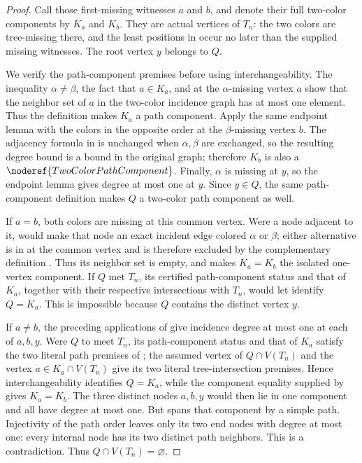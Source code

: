 \begin{proof}
Call those first-missing witnesses \(a\) and \(b\), and denote their full
two-color components by \(K_a\) and \(K_b\).  They are actual vertices of
\(T_n\): the two colors are tree-missing there, and the least positions in
 occur no later than the supplied
missing witnesses.  The root vertex \(y\) belongs to \(Q\).

We verify the path-component premises before using interchangeability.
The inequality \(\alpha\ne\beta\), the fact that \(a\in K_a\), and
 at the \(\alpha\)-missing vertex
\(a\) show that the neighbor set of \(a\) in the two-color incidence graph
has at most one element.  Thus the definition
 makes \(K_a\) a path component.  Apply the
same endpoint lemma with the colors in the opposite order at the
\(\beta\)-missing vertex \(b\).  The adjacency formula in
 is unchanged when \(\alpha,\beta\) are
exchanged, so the resulting degree bound is a bound in the original graph;
therefore \(K_b\) is also a \(\noderef{TwoColorPathComponent}\).  Finally,
\(\alpha\) is missing at \(y\), so the endpoint lemma gives degree at most
one at \(y\).  Since \(y\in Q\), the same path-component definition makes
\(Q\) a two-color path component as well.

If \(a=b\), both colors are missing at this common vertex.  Were a node
adjacent to it,  would make that node an
exact incident edge colored \(\alpha\) or \(\beta\); either alternative is
in  at the common vertex and is therefore excluded
by the complementary definition .  Thus its neighbor
set is empty, and  makes \(K_a=K_b\) the isolated
one-vertex component.  If \(Q\) met \(T_n\), its certified path-component
status and that of \(K_a\), together with their respective intersections
with \(T_n\), would let  identify \(Q=K_a\).
This is impossible because \(Q\) contains the distinct vertex \(y\).

If \(a\ne b\), the preceding applications of
 give incidence degree at most one
at each of \(a,b,y\).  Were \(Q\) to meet \(T_n\), its path-component
status and that of \(K_a\) satisfy the two literal path premises of
; the assumed vertex of \(Q\cap V(T_n)\) and
the vertex \(a\in K_a\cap V(T_n)\) give its two literal tree-intersection
premises.  Hence interchangeability identifies \(Q=K_a\), while the
component equality supplied by
 gives \(K_a=K_b\).  The three distinct nodes
\(a,b,y\) would then lie in one component and all have degree at most one.
But
 spans that component by a simple
path.  Injectivity of the path order leaves only its two end nodes with
degree at most one: every internal node has its two distinct path
neighbors.  This is a contradiction.  Thus \(Q\cap V(T_n)=\varnothing\).


\end{proof}
